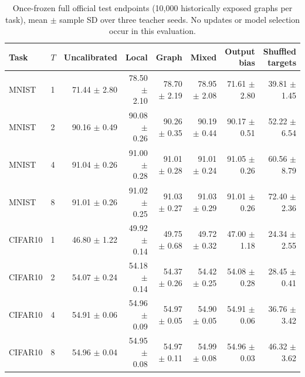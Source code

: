 \begin{table}[t]
\centering\footnotesize
\begin{tabular}{llrrrrrr}
\toprule
Task & $T$ & Uncalibrated & Local & Graph & Mixed & Output bias & Shuffled targets \\
\midrule
MNIST & 1 & 71.44 $\pm$ 2.80 & 78.50 $\pm$ 2.10 & 78.70 $\pm$ 2.19 & 78.95 $\pm$ 2.08 & 71.61 $\pm$ 2.80 & 39.81 $\pm$ 1.45 \\
MNIST & 2 & 90.16 $\pm$ 0.49 & 90.08 $\pm$ 0.26 & 90.26 $\pm$ 0.35 & 90.19 $\pm$ 0.44 & 90.17 $\pm$ 0.51 & 52.22 $\pm$ 6.54 \\
MNIST & 4 & 91.04 $\pm$ 0.26 & 91.00 $\pm$ 0.28 & 91.01 $\pm$ 0.28 & 91.01 $\pm$ 0.24 & 91.05 $\pm$ 0.26 & 60.56 $\pm$ 8.79 \\
MNIST & 8 & 91.01 $\pm$ 0.26 & 91.02 $\pm$ 0.25 & 91.03 $\pm$ 0.27 & 91.03 $\pm$ 0.29 & 91.01 $\pm$ 0.26 & 72.40 $\pm$ 2.36 \\
\midrule
CIFAR10 & 1 & 46.80 $\pm$ 1.22 & 49.92 $\pm$ 0.14 & 49.75 $\pm$ 0.68 & 49.72 $\pm$ 0.32 & 47.00 $\pm$ 1.18 & 24.34 $\pm$ 2.55 \\
CIFAR10 & 2 & 54.07 $\pm$ 0.24 & 54.18 $\pm$ 0.14 & 54.37 $\pm$ 0.26 & 54.42 $\pm$ 0.25 & 54.08 $\pm$ 0.28 & 28.45 $\pm$ 0.41 \\
CIFAR10 & 4 & 54.91 $\pm$ 0.06 & 54.96 $\pm$ 0.09 & 54.97 $\pm$ 0.05 & 54.90 $\pm$ 0.05 & 54.91 $\pm$ 0.06 & 36.76 $\pm$ 3.42 \\
CIFAR10 & 8 & 54.96 $\pm$ 0.04 & 54.95 $\pm$ 0.08 & 54.97 $\pm$ 0.11 & 54.99 $\pm$ 0.08 & 54.96 $\pm$ 0.03 & 46.32 $\pm$ 3.62 \\
\bottomrule
\end{tabular}
\caption{Once-frozen full official test endpoints (10,000 historically exposed graphs per task), mean $\pm$ sample SD over three teacher seeds. No updates or model selection occur in this evaluation.}
\label{tab:test}
\end{table}
